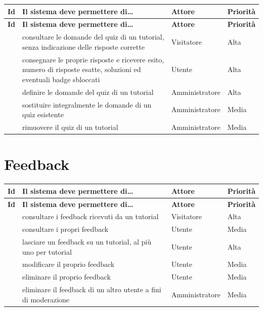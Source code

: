 \begin{longtable}{@{}l L{7.3cm} L{2.6cm} L{1.8cm}@{}}
\toprule
\textbf{Id} & \textbf{Il sistema deve permettere di\dots} & \textbf{Attore} &
\textbf{Priorità} \\
\midrule
\endfirsthead
\toprule
\textbf{Id} & \textbf{Il sistema deve permettere di\dots} & \textbf{Attore} &
\textbf{Priorità} \\
\midrule
\endhead
\bottomrule
\endlastfoot

 & consultare le domande del quiz di un tutorial, senza
  indicazione delle risposte corrette & Visitatore & Alta \\
 & consegnare le proprie risposte e ricevere esito, numero di
  risposte esatte, soluzioni ed eventuali badge sbloccati & Utente & Alta \\
 & definire le domande del quiz di un tutorial &
  Amministratore & Alta \\
 & sostituire integralmente le domande di un quiz esistente &
  Amministratore & Media \\
 & rimuovere il quiz di un tutorial & Amministratore & Media \\

\end{longtable}

\section{Feedback}

\begin{longtable}{@{}l L{7.3cm} L{2.6cm} L{1.8cm}@{}}
\toprule
\textbf{Id} & \textbf{Il sistema deve permettere di\dots} & \textbf{Attore} &
\textbf{Priorità} \\
\midrule
\endfirsthead
\toprule
\textbf{Id} & \textbf{Il sistema deve permettere di\dots} & \textbf{Attore} &
\textbf{Priorità} \\
\midrule
\endhead
\bottomrule
\endlastfoot

 & consultare i feedback ricevuti da un tutorial &
  Visitatore & Alta \\
 & consultare i propri feedback & Utente & Media \\
 & lasciare un feedback su un tutorial, al più uno per tutorial &
  Utente & Alta \\
 & modificare il proprio feedback & Utente & Media \\
 & eliminare il proprio feedback & Utente & Media \\
 & eliminare il feedback di un altro utente a fini di
  moderazione & Amministratore & Media \\

\end{longtable}

